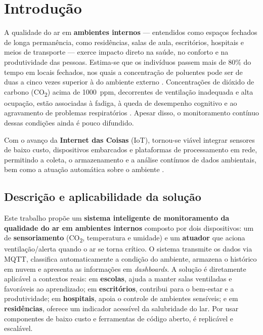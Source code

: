 \documentclass[12pt,a4paper]{article}
\begin{document}
\vspace{0.5cm}

\section{Introdução}

A qualidade do ar em \textbf{ambientes internos} --- entendidos como espaços fechados de longa
permanência, como residências, salas de aula, escritórios, hospitais e meios de transporte --- exerce
impacto direto na saúde, no conforto e na produtividade das pessoas. Estima-se que os indivíduos passem
mais de 80\% do tempo em locais fechados, nos quais a concentração de poluentes pode ser de duas a cinco
vezes superior à do ambiente externo \cite{who2021}. Concentrações de dióxido de carbono
(CO\textsubscript{2}) acima de 1000~ppm, decorrentes de ventilação inadequada e alta ocupação, estão
associadas à fadiga, à queda de desempenho cognitivo e ao agravamento de problemas respiratórios
\cite{ashrae2019}. Apesar disso, o monitoramento contínuo dessas condições ainda é pouco difundido.

Com o avanço da \textbf{Internet das Coisas} (IoT), tornou-se viável integrar sensores de baixo custo,
dispositivos embarcados e plataformas de processamento em rede, permitindo a coleta, o armazenamento e a
análise contínuos de dados ambientais, bem como a atuação automática sobre o ambiente \cite{atzori2010}.

\subsection{Descrição e aplicabilidade da solução}

Este trabalho propõe um \textbf{sistema inteligente de monitoramento da qualidade do ar em ambientes
internos} composto por dois dispositivos: um de \textbf{sensoriamento} (CO\textsubscript{2}, temperatura
e umidade) e um \textbf{atuador} que aciona ventilação/alerta quando o ar se torna crítico. O sistema
transmite os dados via MQTT, classifica automaticamente a condição do ambiente, armazena o histórico em
nuvem e apresenta as informações em \textit{dashboards}. A solução é diretamente aplicável a contextos
reais: em \textbf{escolas}, ajuda a manter salas ventiladas e favoráveis ao aprendizado; em
\textbf{escritórios}, contribui para o bem-estar e a produtividade; em \textbf{hospitais}, apoia o
controle de ambientes sensíveis; e em \textbf{residências}, oferece um indicador acessível da salubridade
do lar. Por usar componentes de baixo custo e ferramentas de código aberto, é replicável e escalável.
\end{document}
